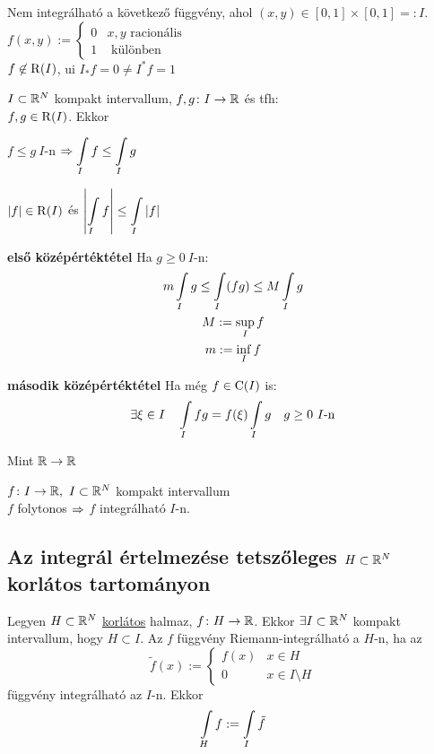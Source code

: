 \begin{pl}Nem integrálható a következő függvény, ahol $(x,y)\in [0,1]\times[0,1]=:I$.\\
  $f(x,y):=\begin{cases}0 & x,y \text{ racionális }\\1 &\text{ különben}\end{cases}$\\
  $f\not\in\operatorname{R}(I)$, ui $I_*f=0\neq I^*f=1$
\end{pl}
\begin{te}[Egyenlőtlenség]$I\subset\mathbb{R}^N$ kompakt intervallum, $f,g\colon I\to\mathbb{R}$ és tfh:\\$f,g\in\operatorname{R}(I)$. Ekkor
  \begin{enumzjb}
    \item $f\leq g\ I$-n $\di\nn \Int_If\leq \Int_Ig$
    \item $\vert f\vert\in\operatorname{R}(I)$ és $\di\left\vert\Int_If\right\vert\leq\Int_I\vert f\vert$
    \item \textbf{első középértéktétel} Ha $g\geq 0\ I$-n:
      \begin{gather*}
	m\Int_Ig\leq \Int_I(fg)\leq M\Int_Ig\\
	M:=\sup_If\\
	m:=\inf_If
      \end{gather*}
    \item \textbf{második középértéktétel} Ha  még $f\in\operatorname{C}(I)$ is:
      \[\exists \xi \in I\quad \Int_I fg = f(\xi)\Int_Ig\quad g\geq 0\ I\text{-n}\]
  \end{enumzjb}
\end{te}
\begin{biz}Mint $\mathbb{R}\to\mathbb{R}$\end{biz}

\begin{te}$f\colon I\to\mathbb{R},\ I\subset\mathbb{R}^N$ kompakt intervallum\\
  $f$ folytonos $\Rightarrow$ $f$ integrálható $I$-n.
\end{te}

\subsection{Az integrál értelmezése tetszőleges $H\subset \mathbb{R}^N$ korlátos tartományon}
\begin{de}Legyen $H\subset\mathbb{R}^N$ \underline{korlátos} halmaz, $f\colon H\to\mathbb{R}$. Ekkor $\exists I\subset\mathbb{R}^N$ kompakt
  intervallum, hogy $H\subset I$. Az $f$ függvény Riemann-integrálható a $H$-n, ha az
\[ \tilde{f}(x) := \begin{cases}f(x)& x\in H\\0& x\in I\setminus H \end{cases}\]
függvény integrálható az $I$-n. Ekkor
\[ \Int_Hf := \Int_I\tilde{f}\]
\end{de}


